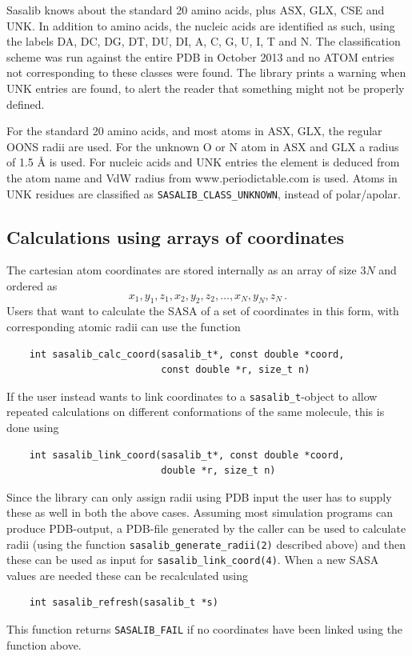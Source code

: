 \documentclass[a4paper,11pt]{article}
\begin{document}
Sasalib knows about the standard 20 amino acids, plus ASX, GLX,
CSE and UNK. In addition to amino acids, the nucleic acids are
identified as such, using the labels DA, DC, DG, DT, DU, DI, A, C, G,
U, I, T and N. The classification scheme was run against the entire
PDB in October 2013 and no ATOM entries not corresponding to these
classes were found. The library prints a warning when UNK entries are
found, to alert the reader that something might not be properly
defined.

For the standard 20 amino acids, and most atoms in ASX, GLX, the
regular OONS radii \cite{OONS} are used. For the unknown O or N atom in
ASX and GLX a radius of 1.5 Å is used. For nucleic acids and UNK
entries the element is deduced from the atom name and VdW radius from
www.periodictable.com is used. Atoms in UNK residues are classified as
\verb|SASALIB_CLASS_UNKNOWN|, instead of polar/apolar.

\subsection{Calculations using arrays of coordinates}

The cartesian atom coordinates are stored internally as an array of
size $3N$ and ordered as $$x_1,y_1,z_1, x_2,y_2,z_2, \ldots ,x_N,y_N,z_N\,.$$
Users that want to calculate the SASA of a set of coordinates in this form,
with corresponding atomic radii can use the function
\begin{verbatim}
    int sasalib_calc_coord(sasalib_t*, const double *coord, 
                           const double *r, size_t n)
\end{verbatim}
If the user instead wants to link coordinates to a
\verb|sasalib_t|-object to allow repeated calculations on different
conformations of the same molecule, this is done using
\begin{verbatim}
    int sasalib_link_coord(sasalib_t*, const double *coord,
                           double *r, size_t n)
\end{verbatim}

Since the library can only assign radii using PDB input the user has
to supply these as well in both the above cases. Assuming most
simulation programs can produce PDB-output, a PDB-file generated by
the caller can be used to calculate radii (using the function
\verb|sasalib_generate_radii(2)| described above) and then these
can be used as input for \verb|sasalib_link_coord(4)|. When a new
SASA values are needed these can be recalculated using
\begin{verbatim} 
    int sasalib_refresh(sasalib_t *s)
\end{verbatim}
This function returns \verb|SASALIB_FAIL| if no coordinates have
been linked using the function above.
\end{document}

